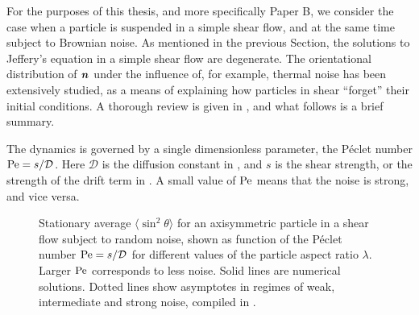 \documentclass[thesis.tex]{subfiles}
\begin{document}
For the purposes of this thesis, and more specifically Paper B, we consider the case when a particle is suspended in a simple shear flow, and at the same time subject to Brownian noise. As mentioned in the previous Section, the solutions to Jeffery's equation in a simple shear flow are degenerate. The orientational distribution of $\mbox{\boldmath$n$}$ under the influence of, for example, thermal noise has been extensively studied, as a means of explaining how particles in shear ``forget'' their initial conditions. A thorough review is given in \cite{brenner1974}, and what follows is a brief summary.

The dynamics is governed by a single dimensionless parameter, the P\'eclet number $\mbox{Pe} = s/\mathcal D$. Here $\mathcal D$ is the diffusion constant in , and $s$ is the shear strength, or the strength of the drift term in . A small value of $\mbox{Pe}$ means that the noise is strong, and vice versa. 

\begin{figure}
\begin{center}
\end{center}
\caption{ Stationary average $\langle \sin ^2\theta \rangle$ for an axisymmetric particle in a shear flow subject to random noise, shown as function of the P\'eclet number $\mbox{Pe} = s/\mathcal D$ for different values of the particle aspect ratio $\lambda$. Larger $\mbox{Pe}$ corresponds to less noise. Solid lines are numerical solutions. Dotted lines show asymptotes in regimes of weak, intermediate and strong noise, compiled in \cite{brenner1974}.}%
\end{figure}
\end{document}
